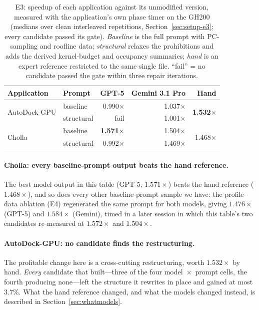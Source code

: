 \begin{table}[t]
\centering
\footnotesize
\caption{E3: speedup of each application against its unmodified version, measured with the
  application's own phase timer on the GH200 (medians over clean interleaved repetitions,
  Section~\ref{sec:setup-e3}; every candidate passed its gate). \emph{Baseline} is the full prompt
  with PC-sampling and roofline data; \emph{structural} relaxes the prohibitions and adds the derived
  kernel-budget and occupancy summaries; \emph{hand} is an expert reference restricted to the same
  single file. ``fail'' = no candidate passed the gate within three repair iterations.}
\label{tab:realapps}
\setlength{\tabcolsep}{3pt}
\begin{tabular}{@{}llrrr@{}}
\toprule
\textbf{Application} & \textbf{Prompt} & \textbf{GPT-5} & \textbf{Gemini 3.1 Pro} & \textbf{Hand} \\
\midrule
\multirow{2}{*}{AutoDock-GPU}
  & baseline    & 0.990$\times$ & 1.037$\times$ & \multirow{2}{*}{\textbf{1.532}$\times$} \\
  & structural  & fail          & 1.001$\times$ & \\
\midrule
\multirow{2}{*}{Cholla}
  & baseline    & \textbf{1.571}$\times$ & 1.504$\times$ & \multirow{2}{*}{1.468$\times$} \\
  & structural  & 0.992$\times$ & 1.469$\times$ & \\
\bottomrule
\end{tabular}
\end{table}

\paragraph{Cholla: every baseline-prompt output beats the hand reference.}
The best model output in this table (GPT-5, $1.571\times$) beats the hand reference ($1.468\times$),
and so does every other baseline-prompt sample we have: the profile-data ablation (E4) regenerated the
same prompt for both models, giving $1.476\times$ (GPT-5) and $1.584\times$ (Gemini), timed in a
later session in which this table's two candidates re-measured at $1.572\times$ and $1.504\times$.

\paragraph{AutoDock-GPU: no candidate finds the restructuring.}
The profitable change here is a cross-cutting restructuring, worth $1.532\times$ by hand. \emph{Every}
candidate that built---three of the four model~$\times$~prompt cells, the fourth producing none---left
the structure it rewrites in place and gained at most $3.7\%$. What the hand reference changed, and
what the models changed instead, is described in Section~\ref{sec:whatmodels}.

